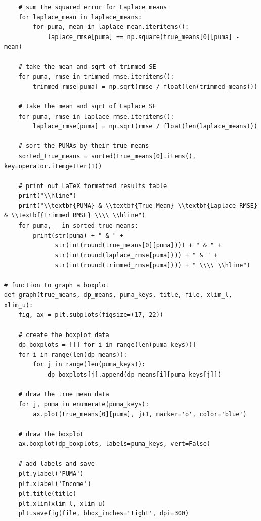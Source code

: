 \documentclass[12pt]{article}
\begin{document}
\begin{appendices}
\begin{lstlisting}
    # sum the squared error for Laplace means
    for laplace_mean in laplace_means:
        for puma, mean in laplace_mean.iteritems():
            laplace_rmse[puma] += np.square(true_means[0][puma] - mean)

    # take the mean and sqrt of trimmed SE
    for puma, rmse in trimmed_rmse.iteritems():
        trimmed_rmse[puma] = np.sqrt(rmse / float(len(trimmed_means)))

    # take the mean and sqrt of Laplace SE
    for puma, rmse in laplace_rmse.iteritems():
        laplace_rmse[puma] = np.sqrt(rmse / float(len(laplace_means)))

    # sort the PUMAs by their true means
    sorted_true_means = sorted(true_means[0].items(), key=operator.itemgetter(1))

    # print out LaTeX formatted results table
    print("\\hline")
    print("\\textbf{PUMA} & \\textbf{True Mean} \\textbf{Laplace RMSE} & \\textbf{Trimmed RMSE} \\\\ \\hline")
    for puma, _ in sorted_true_means:
        print(str(puma) + " & " +
              str(int(round(true_means[0][puma]))) + " & " +
              str(int(round(laplace_rmse[puma]))) + " & " +
              str(int(round(trimmed_rmse[puma]))) + " \\\\ \\hline")

# function to graph a boxplot
def graph(true_means, dp_means, puma_keys, title, file, xlim_l, xlim_u):
    fig, ax = plt.subplots(figsize=(17, 22))

    # create the boxplot data
    dp_boxplots = [[] for i in range(len(puma_keys))]
    for i in range(len(dp_means)):
        for j in range(len(puma_keys)):
            dp_boxplots[j].append(dp_means[i][puma_keys[j]])

    # draw the true mean data
    for j, puma in enumerate(puma_keys):
        ax.plot(true_means[0][puma], j+1, marker='o', color='blue')

    # draw the boxplot
    ax.boxplot(dp_boxplots, labels=puma_keys, vert=False)

    # add labels and save
    plt.ylabel('PUMA')
    plt.xlabel('Income')
    plt.title(title)
    plt.xlim(xlim_l, xlim_u)
    plt.savefig(file, bbox_inches='tight', dpi=300)


\end{lstlisting}
\end{appendices}
\end{document}
